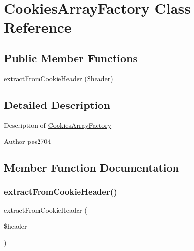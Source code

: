 \hypertarget{class_pes_1_1_http_1_1_factory_1_1_cookies_array_factory}{}\section{Cookies\+Array\+Factory Class Reference}
\label{class_pes_1_1_http_1_1_factory_1_1_cookies_array_factory}
\subsection*{Public Member Functions}
\begin{DoxyCompactItemize}
\item 
\mbox{\hyperlink{class_pes_1_1_http_1_1_factory_1_1_cookies_array_factory_a890a4fd79e9636aa28c1c5e8d4f68628}{extract\+From\+Cookie\+Header}} (\$header)
\end{DoxyCompactItemize}


\subsection{Detailed Description}
Description of \mbox{\hyperlink{class_pes_1_1_http_1_1_factory_1_1_cookies_array_factory}{Cookies\+Array\+Factory}}

\begin{DoxyAuthor}{Author}
pes2704 
\end{DoxyAuthor}


\subsection{Member Function Documentation}
\mbox{\label{class_pes_1_1_http_1_1_factory_1_1_cookies_array_factory_a890a4fd79e9636aa28c1c5e8d4f68628}} 
\subsubsection{\texorpdfstring{extract\+From\+Cookie\+Header()}{extractFromCookieHeader()}}
{\footnotesize\ttfamily extract\+From\+Cookie\+Header (\begin{DoxyParamCaption}\item[{}]{\$header }\end{DoxyParamCaption})}

